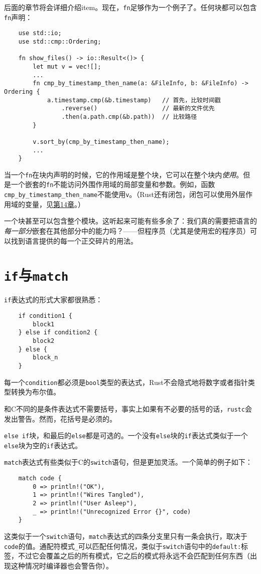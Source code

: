 后面的章节将会详细介绍item。现在，\texttt{fn}足够作为一个例子了。任何块都可以包含\texttt{fn}声明：
\begin{verbatim}
    use std::io;
    use std::cmp::Ordering;

    fn show_files() -> io::Result<()> {
        let mut v = vec![];
        ...
        fn cmp_by_timestamp_then_name(a: &FileInfo, b: &FileInfo) -> Ordering {
            a.timestamp.cmp(&b.timestamp)   // 首先，比较时间戳 
                .reverse()                  // 最新的文件优先
                .then(a.path.cmp(&b.path))  // 比较路径
        }

        v.sort_by(cmp_by_timestamp_then_name);
        ...
    }
\end{verbatim}

当一个\texttt{fn}在块内声明的时候，它的作用域是整个块，它可以在整个块内\emph{使用}。但是一个嵌套的\texttt{fn}不能访问外围作用域的局部变量和参数。例如，函数\texttt{cmp\_by\_timestamp\_then\_name}不能使用\texttt{v}。（Rust还有闭包，闭包可以使用外层作用域的变量，见\hyperref[ch14]{第14章}。）

一个块甚至可以包含整个模块。这听起来可能有些多余了：我们真的需要把语言的\emph{每一部分}嵌套在其他部分中的能力吗？——但程序员（尤其是使用宏的程序员）可以找到语言提供的每一个正交碎片的用法。

\section{\texttt{if}与\texttt{match}}

\texttt{if}表达式的形式大家都很熟悉：
\begin{verbatim}
    if condition1 {
        block1
    } else if condition2 {
        block2
    } else {
        block_n
    }
\end{verbatim}

每一个\texttt{condition}都必须是\texttt{bool}类型的表达式，Rust不会隐式地将数字或者指针类型转换为布尔值。

和C不同的是条件表达式不需要括号，事实上如果有不必要的括号的话，\texttt{rustc}会发出警告。然而，花括号是必须的。

\texttt{else if}块，和最后的\texttt{else}都是可选的。一个没有\texttt{else}块的\texttt{if}表达式类似于一个\texttt{else}块为空的\texttt{if}表达式。

\texttt{match}表达式有些类似于C的\texttt{switch}语句，但是更加灵活。一个简单的例子如下：
\begin{verbatim}
    match code {
        0 => println!("OK"),
        1 => println!("Wires Tangled"),
        2 => println!("User Asleep"),
        _ => println!("Unrecognized Error {}", code)
    }
\end{verbatim}
这类似于一个\texttt{switch}语句，\texttt{match}表达式的四条分支里只有一条会执行，取决于\texttt{code}的值。通配符模式\texttt{\_}可以匹配任何情况，类似于\texttt{switch}语句中的\texttt{default:}标签，不过它会覆盖之后的所有模式，它之后的模式将永远不会匹配到任何东西（出现这种情况时编译器也会警告你）。

